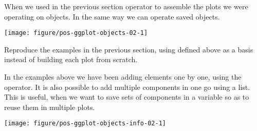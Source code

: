 \documentclass[krantz2]{krantz}\usepackage{knitr}%
\begin{document}
When we used in the previous section operator \code{+} to assemble the plots we were operating on \Rlang objects. In the same way we can operate saved objects.

\begin{knitrout}\footnotesize
{}\color{fgcolor}\begin{kframe}
\begin{alltt}
 \hlopt{+}
  \hlstd{(} \hlstd{=} \hlstd{,}  \hlstd{=} \hlstd{)}
\end{alltt}
\end{kframe}

{\centering \texttt{[image: figure/pos-ggplot-objects-02-1]} 

}



\end{knitrout}

\begin{playground}
  Reproduce the examples in the previous section, using  defined above as a basis instead of building each plot from scratch.
\end{playground}

\begin{infobox}
  In the examples above we have been adding elements one by one, using the \code{+} operator. It is also possible to add multiple components in one go using a list. This is useful, when we want to save sets of components in a variable so as to reuse them in multiple plots.

\begin{knitrout}\footnotesize
{}\color{fgcolor}\begin{kframe}
\begin{alltt}
 \hlkwb{<-} \hlstd{(}
    \hlstd{(} \hlstd{=} \hlstd{,}  \hlstd{=} \hlstd{),}
    \hlstd{())}
\end{alltt}
\end{kframe}
\end{knitrout}

\begin{knitrout}\footnotesize
{}\color{fgcolor}\begin{kframe}
\begin{alltt}
 \hlopt{+} 
\end{alltt}
\end{kframe}

{\centering \texttt{[image: figure/pos-ggplot-objects-info-02-1]} 

}



\end{knitrout}

\end{infobox}
\end{document}
